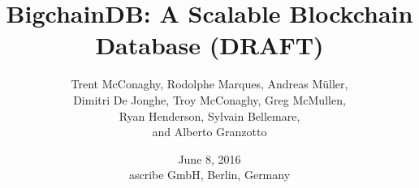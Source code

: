 \documentclass[a4paper]{scrartcl}
\title{\LARGE BigchainDB: A Scalable Blockchain Database (DRAFT)}
\author{
  Trent McConaghy, 
  Rodolphe Marques,
  Andreas M\"{u}ller,\\
  Dimitri De Jonghe,
  Troy McConaghy,
  Greg McMullen,\\
  Ryan Henderson,
  Sylvain Bellemare,\\
  and
  Alberto Granzotto
}
\date{\normalsize June 8, 2016\\ascribe GmbH, Berlin, Germany}
\begin{document}
\maketitle















\begin{appendices}




\end{appendices}

{\footnotesize{}}

\end{document}
